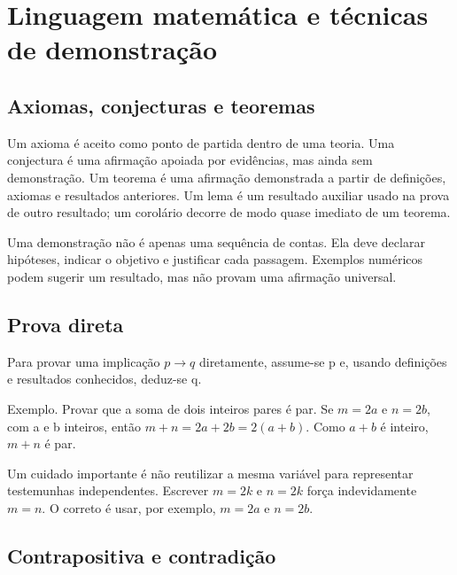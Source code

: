 \documentclass[12pt,a4paper,openany]{book}
\begin{document}
\chapter{Linguagem matemática e técnicas de demonstração}



\section{Axiomas, conjecturas e teoremas}



Um axioma é aceito como ponto de partida dentro de uma teoria. Uma conjectura é uma afirmação apoiada por evidências, mas ainda sem demonstração. Um teorema é uma afirmação demonstrada a partir de definições, axiomas e resultados anteriores. Um lema é um resultado auxiliar usado na prova de outro resultado; um corolário decorre de modo quase imediato de um teorema.



Uma demonstração não é apenas uma sequência de contas. Ela deve declarar hipóteses, indicar o objetivo e justificar cada passagem. Exemplos numéricos podem sugerir um resultado, mas não provam uma afirmação universal.



\section{Prova direta}



Para provar uma implicação $p\to q$ diretamente, assume-se p e, usando definições e resultados conhecidos, deduz-se q.



\begin{exemplo}{Exemplo.}
Provar que a soma de dois inteiros pares é par. Se $m=2a$ e $n=2b$, com a e b inteiros, então $m+n=2a+2b=2(a+b)$. Como $a+b$ é inteiro, $m+n$ é par.
\end{exemplo}



Um cuidado importante é não reutilizar a mesma variável para representar testemunhas independentes. Escrever $m=2k$ e $n=2k$ força indevidamente $m=n$. O correto é usar, por exemplo, $m=2a$ e $n=2b$.



\section{Contrapositiva e contradição}
\end{document}
